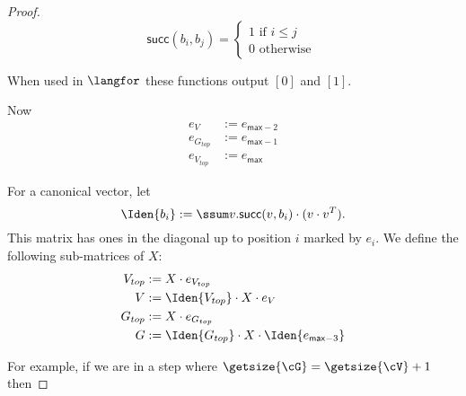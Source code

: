 \begin{proof}
\[
  			\mathsf{succ}(b_i,b_j)=\begin{cases}
               1 \text{ if } i\leq j \\
               0 \text{ otherwise }
             \end{cases}
\]

When used in $\langfor$ these functions output $[0]$ and $[1]$.

Now 
\begin{align*}
	e_{V}&:=e_{\mathsf{max}-2} \\
	e_{G_{top}}&:=e_{\mathsf{max}-1} \\
	e_{V_{top}}&:=e_{\mathsf{max}}
\end{align*}

For a canonical vector, let $$\Iden{b_i}:=\ssum v. \mathsf{succ}(v,b_i)\cdot (v\cdot v^T).$$ This matrix has ones in the diagonal up to position $i$ marked by $e_{i}$. We define the following sub-matrices of $X$:
\begin{align*}
	V_{top} &:= X\cdot e_{V_{top}} \\
	V &:= \Iden{V_{top}} \cdot X \cdot e_V \\
 	G_{top} &:=X\cdot e_{G_{top}} \\
 	G &:= \Iden{G_{top}}\cdot X \cdot \Iden{e_{\mathsf{max}-3}}
\end{align*}

For example, if we are in a step where $\getsize{\cG}=\getsize{\cV} + 1$ then


\end{proof}
